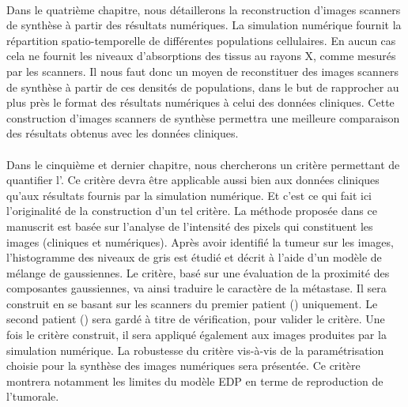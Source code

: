 \documentclass[main.tex]{subfiles}
\begin{document}
\paragraph{}
Dans le quatrième chapitre, nous détaillerons la reconstruction %
d'images scanners de synthèse à partir des résultats numériques. La simulation numérique fournit la répartition spatio-temporelle de différentes populations cellulaires. En aucun cas cela ne fournit les niveaux d'absorptions des tissus au rayons X, comme mesurés par les scanners. Il nous faut donc un moyen de reconstituer des images scanners de synthèse à partir de ces densités de populations, dans le but de rapprocher au plus près %
le format des résultats numériques à celui des données cliniques.
Cette construction d'images scanners de synthèse permettra une meilleure comparaison des résultats obtenus avec les données cliniques. 


\paragraph{}
Dans le cinquième et dernier chapitre, nous chercherons un critère permettant de quantifier l'\hetero.  Ce critère devra être applicable aussi bien aux données cliniques qu'aux résultats fournis par la simulation numérique. Et c'est ce qui fait ici l'originalité de la construction d'un tel critère. 
La méthode proposée dans ce manuscrit est basée sur l'analyse %
de l'intensité des pixels 
qui constituent les images (cliniques et numériques). 
Après avoir identifié la tumeur sur les images, l'histogramme des niveaux de gris est étudié et décrit à l'aide 
d'un modèle de mélange de gaussiennes. 
Le critère, basé sur une évaluation de la proximité des %
composantes gaussiennes, va ainsi traduire le caractère \heterogene de la métastase. 
Il sera construit en se basant sur les scanners du premier patient (\Nber) uniquement. 
Le second patient (\Chen) sera gardé à titre de vérification, pour valider le critère. 
Une fois le critère construit, il sera appliqué également aux images produites par la simulation numérique. 
La robustesse du critère vis-à-vis de la paramétrisation choisie pour la synthèse des images  numériques sera présentée. 
Ce critère montrera notamment les limites du modèle EDP en terme de reproduction de l'\hetero tumorale.
\end{document}
